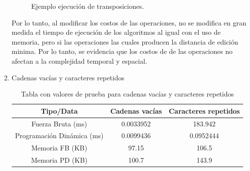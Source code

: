 \begin{enumerate}
\begin{figure}[H]
        \hfill
        \caption{Ejemplo ejecución de transposiciones.}
        \label{fig:trans}
    \end{figure}

    Por lo tanto, al modificar los costos de las operaciones, no
    se modifica en gran medida el tiempo de ejecución de los algoritmos
    al igual con el uso de memoria, pero si las operaciones las cuales producen la distancia de edición
    minima. Por lo tanto,
    se evidencia que los costos de de las operaciones no afectan a la complejidad
    temporal y espacial.

    \item Cadenas vacías y caracteres repetidos
    
        \begin{table}[H]
        \centering
        \begin{tabular}{|c|c|c|}
        \hline
        \textbf{Tipo/Data} & \textbf{Cadenas vacías} & \textbf{Caracteres repetidos}\\ \hline
        Fuerza Bruta (ms) & 0.0033952 & 183.942 \\ \hline
        Programación Dinámica (ms) & 0.0099436 & 0.0952444 \\ \hline
        Memoria FB (KB) & 97.15 & 106.5   \\ \hline
        Memoria PD (KB) & 100.7 & 143.9 \\ \hline
      
        \end{tabular}
        \caption{Tabla con valores de prueba para cadenas vacías y caracteres repetidos}
        \label{tab:tabla2}
        \end{table}


\end{enumerate}
